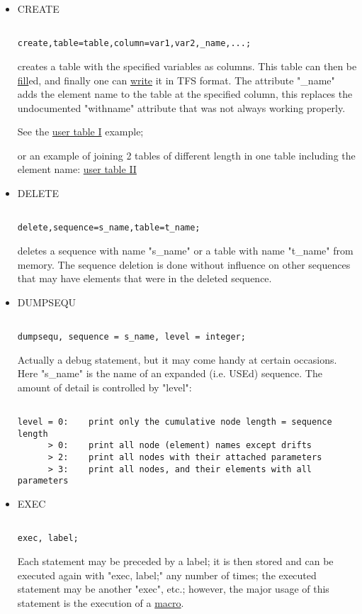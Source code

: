 \begin{itemize}
	\item CREATE
\begin{verbatim}

create,table=table,column=var1,var2,_name,...;
\end{verbatim} creates a table with the specified variables as columns. This table can then be \hyperlink{fill}{fill}ed, and finally one can \hyperlink{write}{write} it in TFS format. The attribute "\_name" adds the element name to the table at the specified column, this replaces the undocumented "withname" attribute that was not always working properly. 

 See the \href{../Introduction/select.html#ucreate}{user table I} example; 

 or an example of joining 2 tables of different length in one table including the element name: \href{../Introduction/select.html#screate}{user table II}




	\item DELETE
\begin{verbatim}

delete,sequence=s_name,table=t_name;
\end{verbatim} deletes a sequence with name "s\_name" or a table with name "t\_name" from memory. The sequence deletion is done without influence on other sequences that may have elements that were in the deleted sequence. 


	\item DUMPSEQU
\begin{verbatim}

dumpsequ, sequence = s_name, level = integer;
\end{verbatim} Actually a debug statement, but it may come handy at certain occasions. Here "s\_name" is the name of an expanded (i.e. USEd) sequence. The amount of detail is controlled by "level": 
\begin{verbatim}

level = 0:    print only the cumulative node length = sequence length
      > 0:    print all node (element) names except drifts
      > 2:    print all nodes with their attached parameters
      > 3:    print all nodes, and their elements with all parameters
\end{verbatim}


	\item EXEC
\begin{verbatim}

exec, label;
\end{verbatim} Each statement may be preceded by a label; it is then stored and can be executed again with "exec, label;" any number of times; the executed statement may be another "exec", etc.; however, the major usage of this statement is the execution of a \href{special.html#macro}{macro}. 



\end{itemize}
